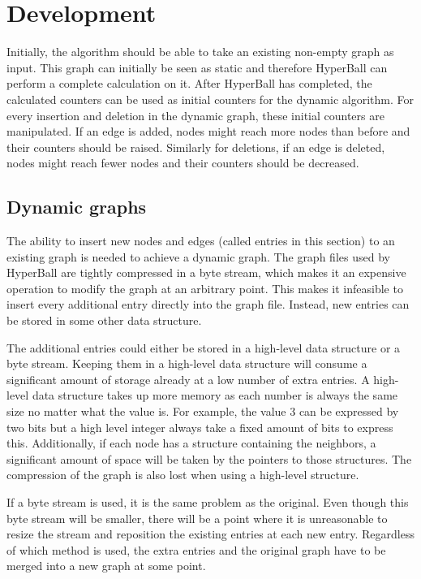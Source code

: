 \chapter{Development}
Initially, the algorithm should be able to take an existing non-empty graph as input. This graph can initially be seen as static and therefore HyperBall can perform a complete calculation on it. After HyperBall has completed, the calculated counters can be used as initial counters for the dynamic algorithm. For every insertion and deletion in the dynamic graph, these initial counters are manipulated. If an edge is added, nodes might reach more nodes than before and their counters should be raised. Similarly for deletions, if an edge is deleted, nodes might reach fewer nodes and their counters should be decreased.


\section{Dynamic graphs}

The ability to insert new nodes and edges (called entries in this section) to an existing graph is needed to achieve a dynamic graph. The graph files used by HyperBall are tightly compressed in a byte stream, which makes it an expensive operation to modify the graph at an arbitrary point. This makes it infeasible to insert every additional entry directly into the graph file. Instead, new entries can be stored in some other data structure.

The additional entries could either be stored in a high-level data structure or a byte stream. Keeping them in a high-level data structure will consume a significant amount of storage already at a low number of extra entries. A high-level data structure takes up more memory as each number is always the same size no matter what the value is. For example, the value 3 can be expressed by two bits but a high level integer always take a fixed amount of bits to express this.  Additionally, if each node has a structure containing the neighbors, a significant amount of space will be taken by the pointers to those structures. The compression of the graph is also lost when using a high-level structure.

If a byte stream is used, it is the same problem as the original. Even though this byte stream will be smaller, there will be a point where it is unreasonable to resize the stream and reposition the existing entries at each new entry. Regardless of which method is used, the extra entries and the original graph have to be merged into a new graph at some point. 

